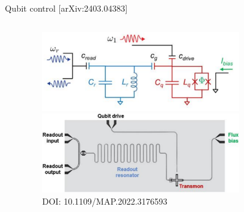 \documentclass[aspectratio=169,10pt]{beamer}
\begin{document}
\begin{frame}{Qubit control \hfill{\small[arXiv:2403.04383]}}
\begin{columns}
\begin{column}{0.45\textwidth}
    \end{column}
    \begin{column}{0.55\textwidth}
      \centering
      \begin{figure}
        \centering
        \vspace{2mm}
        \includegraphics[width=0.8\textwidth]{figures/TransmonCircuit.png}\\
        \vspace{1.5em}
        \includegraphics[width=0.8\textwidth]{figures/TransmonBoard.png}\\
        {\tiny DOI: 10.1109/MAP.2022.3176593}
      \end{figure}
    \end{column}
  \end{columns}   


\end{frame}
\end{document}
